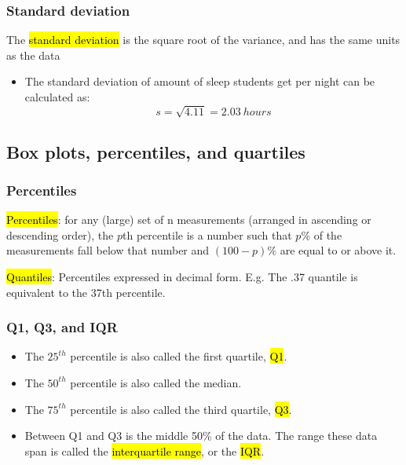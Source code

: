 \documentclass[slidestop,compress,mathserif]{beamer}
\makeatletter
\def\chpii@path{../../Chp 2}
\makeatother
\begin{document}
\begin{frame}
\frametitle{Standard deviation}

The \hl{standard deviation} is the square root of the variance, and has the same units as the data

\formula{
\[ s = \sqrt{s^2} \]
}

\pause

{
\begin{itemize}

\item The standard deviation of amount of sleep students get per night can be calculated as:
\[ s = \sqrt{4.11} = 2.03~hours\]

\end{itemize}
}
{
}

\end{frame}


\subsection{Box plots, percentiles, and quartiles}

\begin{frame}
\frametitle{Percentiles}

\hl{Percentiles}: for any (large) set of n measurements (arranged in ascending or descending order), the $p$th percentile is a number such that $p\%$ of the measurements fall below that number and $(100-p)\%$ are equal to or above it.

\hl{Quantiles}: Percentiles expressed in decimal form.  E.g. The .37 quantile is equivalent to the 37th percentile.

\end{frame}

\begin{frame}[fragile]
\frametitle{Q1, Q3, and IQR}

\begin{itemize}

\item The $25^{th}$ percentile is also called the first quartile, \hl{Q1}.

\item The $50^{th}$ percentile is also called the median.

\item The $75^{th}$ percentile is also called the third quartile, \hl{Q3}.

\item Between Q1 and Q3 is the middle 50\% of the data. The range these data span is called the \hl{interquartile range}, or the \hl{IQR}.
\formula{\[ IQR = Q3 - Q1 \]}
\end{itemize}

\end{frame}
\end{document}
